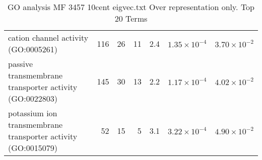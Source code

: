 \begin{table}[ht]
\begin{adjustbox}{width=\textwidth}
\begin{tabular}{lrrrrrr}
  cation channel activity (GO:0005261) & 116 & 26 & 11 & 2.4 & $1.35 \times 10^{-4}$ & $3.70 \times 10^{-2}$ \\ 
  passive transmembrane transporter activity (GO:0022803) & 145 & 30 & 13 & 2.2 & $1.17 \times 10^{-4}$ & $4.02 \times 10^{-2}$ \\ 
  potassium ion transmembrane transporter activity (GO:0015079) & 52 & 15 & 5 & 3.1 & $3.22 \times 10^{-4}$ & $4.90 \times 10^{-2}$ \\ 
   \hline
\end{tabular}
\end{adjustbox}
\caption{GO analysis MF 3457 10cent eigvec.txt Over representation only. Top 20 Terms} 
\label{tab:GO analysis MF 3457 10cent eigvec.txt Over representation only. Top 20 Terms}
\end{table}

